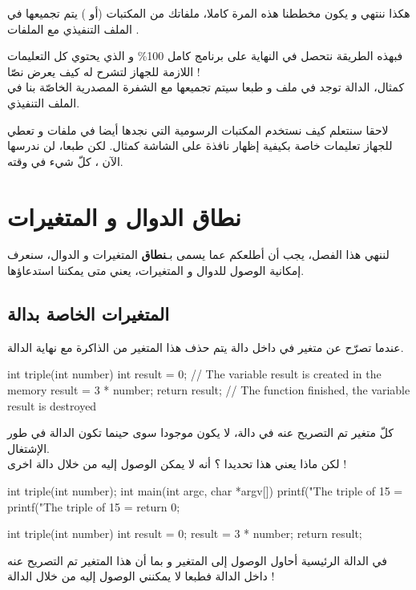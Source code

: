 هكذا ننتهي و يكون مخططنا هذه المرة كاملا، ملفاتك من المكتبات
(أو
)
يتم تجميعها في الملف التنفيذي مع الملفات
.

فبهذه الطريقة نتحصل في النهاية على برنامج كامل
100\%
و الذي يحتوي كل التعليمات اللازمة للجهاز لتشرح له كيف يعرض نصّا !\\
كمثال، الدالة
توجد في ملف
و طبعا سيتم تجميعها مع الشفرة المصدرية الخاصّة بنا في الملف التنفيذي.

لاحقا سنتعلم كيف نستخدم المكتبات الرسومية التي نجدها أيضا في ملفات
و تعطي للجهاز تعليمات خاصة بكيفية إظهار نافذة على الشاشة كمثال. لكن طبعا، لن ندرسها الآن ، كلّ شيء في وقته.

\section{نطاق الدوال و المتغيرات}

لننهي هذا الفصل، يجب أن أطلعكم عما يسمى بـ\textbf{نطاق}
المتغيرات و الدوال، سنعرف إمكانية الوصول للدوال و المتغيرات، يعني متى يمكننا استدعاؤها.

\subsection{المتغيرات الخاصة بدالة}

عندما تصرّح عن متغير في داخل دالة يتم حذف هذا المتغير من الذاكرة مع نهاية الدالة.

\begin{Csource}
int triple(int number)
{
	int result = 0; // The variable result is created in the memory
	result = 3 * number;
	return result;
} // The function finished, the variable result is destroyed
\end{Csource}

كلّ متغير تم التصريح عنه في دالة، لا يكون موجودا سوى حينما تكون الدالة في طور الإشتغال.\\
لكن ماذا يعني هذا تحديدا ؟ أنه لا يمكن الوصول إليه من خلال  دالة اخرى !

\begin{Csource}
int triple(int number);
int main(int argc, char *argv[])
{
	printf("The triple of 15 = %
	printf("The triple of 15 = %
	return 0;
}

int triple(int number)
{
	int result = 0;
	result = 3 * number;
	return result;
}
\end{Csource}

في الدالة الرئيسية أحاول الوصول إلى المتغير
و بما أن هذا المتغير تم التصريح عنه داخل الدالة
فطبعا لا يمكنني الوصول إليه من خلال الدالة
 !

